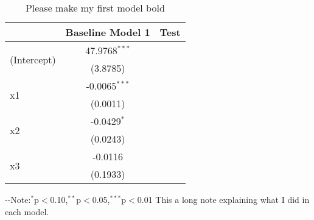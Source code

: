 \begin{table}[H] 
\centering 
\caption{Please make my first model bold} 
\label{tab:myLabel}
\begin{threeparttable}
\begin{tabular}{lcc}
\toprule 
& \textbf{Baseline Model} 1 & Test \\ 
\midrule 
\multirow{2}{*}{(Intercept)}&47.9768$^{***}$ &  \\ 
& (3.8785) &  \\ 
\multirow{2}{*}{x1}&-0.0065$^{***}$ &  \\ 
& (0.0011) &  \\ 
\multirow{2}{*}{x2}&-0.0429$^{*}$ &  \\ 
& (0.0243) &  \\ 
\multirow{2}{*}{x3}&-0.0116 &  \\ 
& (0.1933) &  \\ 
\bottomrule 
\end{tabular} 
\begin{tablenotes} 
\scriptsize 
\item \leavevmode\kern-\scriptspace\kern- Note:$^{*}$p$<$0.10,$^{**}$p$<$0.05,$^{***}$p$<$0.01 This a long note explaining what I did in each model. 
\end{tablenotes}
\end{threeparttable} 
\end{table} 
 
